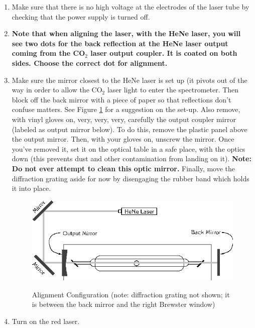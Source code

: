 \documentclass{../lab}
\begin{document}
\begin{enumerate}
    \item Make sure that there is no high voltage at the electrodes of the laser tube by checking that the power supply is turned off.

    \item \textbf{Note that when aligning the laser, with the HeNe laser, you will see two dots for the back reflection at the HeNe laser output coming from the CO$_2$ laser output coupler.  It is coated on both sides. Choose the correct dot for alignment.}

    \item Make sure the mirror closest to the HeNe laser is set up (it pivots out of the way in order to allow the CO$_2$ laser light to enter the spectrometer. Then block off the back mirror with a piece of paper so that reflections don't confuse matters. See Figure \ref{fig:AlignmentConfiguration} for a suggestion on the set-up. Also remove, with vinyl gloves on, very, very, very, carefully the output coupler mirror (labeled as output mirror below). To do this, remove the plastic panel above the output mirror. Then, with your gloves on, unscrew the mirror. Once you've removed it, set it on the optical table in a safe place, with the optics down (this prevents dust and other contamination from landing on it). \textbf{Note: Do not ever attempt to clean this optic mirror.} Finally, move the diffraction grating aside for now by disengaging the rubber band which holds it into place. 

    \begin{figure}[h]
        \centering
        \href{http://experimentationlab.berkeley.edu/sites/default/files/images/CO24.gif}{\includegraphics[width=0.7\linewidth]{images/CO24.png}}
        \caption{Alignment Configuration (note: diffraction grating not shown; it is between the back mirror and the right Brewster window)}
        \label{fig:AlignmentConfiguration}
    \end{figure}

    \item Turn on the red laser.
    

\end{enumerate}
\end{document}
